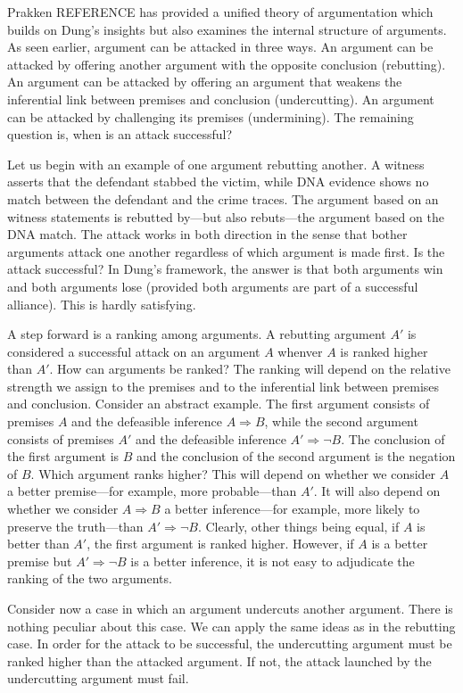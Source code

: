 \documentclass[10pt]{article}
\begin{document}
 Prakken REFERENCE has provided a unified theory of argumentation which builds on Dung's insights but also examines 
 the internal structure of arguments. As seen earlier, argument can be attacked in three ways. An argument can be attacked by offering another argument with the opposite conclusion (rebutting). An argument can be attacked by offering an argument that weakens the inferential link between premises and conclusion (undercutting). An argument can be attacked by challenging its premises (undermining). The remaining question is, when is an attack successful? 

Let us begin with an example of one argument rebutting another.  A witness asserts that the defendant stabbed the victim, while DNA evidence shows no match between the defendant and the crime traces. The argument based on an witness statements is rebutted by---but also rebuts---the argument based on the DNA match. The attack works in both direction in the sense that bother arguments attack one another regardless of which argument is made first. Is the attack successful? In Dung's framework, the answer is that both arguments win and both arguments lose (provided both arguments are part of a successful alliance). This is hardly satisfying. 

A step forward is a ranking among arguments. A rebutting argument $A'$ is considered a successful attack  on an argument $A$ whenver $A$ is ranked higher than $A'$.  How can arguments be ranked? The ranking will depend on the relative strength we assign to the premises and to the inferential link between premises and conclusion. Consider an abstract example. The first argument consists of premises $A$ and the defeasible inference $A\Rightarrow B$, while the second argument consists of premises $A'$ and the defeasible inference $A'\Rightarrow \neg B$. The conclusion of the first argument is $B$ and the conclusion of the second argument is the negation of $B$. Which argument ranks higher? This will depend on whether we consider $A$ a better premise---for example, more probable---than $A'$. It will also depend on whether we consider $A\Rightarrow B$ a better inference---for example, more likely to preserve the truth---than $A'\Rightarrow \neg B$. Clearly, other things being equal, if $A$ is better than $A'$, the first argument is ranked higher. However, if $A$ is a better premise but $A'\Rightarrow \neg B$ is a better inference, it is not easy to adjudicate the ranking of the two arguments.

Consider now a case in which an argument undercuts another argument. There is nothing peculiar about this case. We can apply the same ideas as in the rebutting case. In order for the attack to be successful, the undercutting argument must be ranked higher than the attacked argument. 
If not, the attack launched by the undercutting argument must fail. 
 
\end{document}
